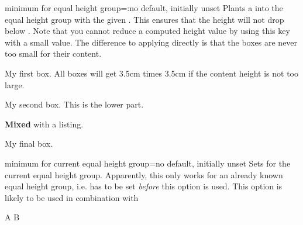 \clearpage
\begin{docTcbKey}{minimum for equal height group}{=:}{no default, initially unset}
  Plants a  into the equal height group with
  the given . This ensures that the height will not drop below
  . Note that you cannot reduce a computed height value
  by using this key with a small value.
  The difference to applying  directly is that the boxes
  are never too small for their content.

\begin{dispExample}

\begin{tcolorbox}
  My first box. All boxes will get 3.5cm times 3.5cm
  if the content height is not too large.
\end{tcolorbox}%
\begin{tcolorbox}
  My second box.
  \tcblower
  This is the lower part.
\end{tcolorbox}%
\begin{tcblisting}{}
\textbf{Mixed}
with a listing.
\end{tcblisting}
\begin{tcolorbox}[title={Fourth box}]
  My final box.
\end{tcolorbox}%
\end{dispExample}
\end{docTcbKey}


\begin{docTcbKey}[][doc new=2016-03-24]{minimum for current equal height group}{=}{no default, initially unset}
  Sets  for the current equal height
  group. Apparently, this only works for an already known equal height group, i.e.
   has to be set \emph{before} this option is used.
  This option is likely to be used in combination with 

\begin{dispExample}
\begin{tcbitemize}[raster equal height,colframe=blue!75!black,colback=white,
  raster every box/.style={minimum for current equal height group=2cm}]
  \tcbitem A
  \tcbitem B
\end{tcbitemize}
\end{dispExample}

\end{docTcbKey}


